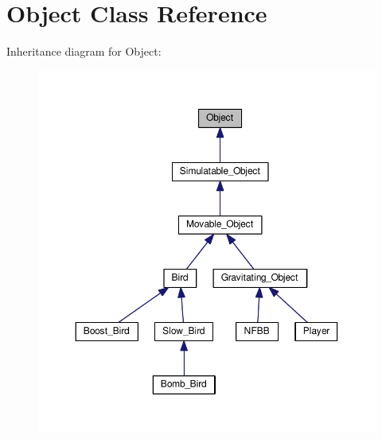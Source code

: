 \hypertarget{classObject}{\section{Object Class Reference}
\label{classObject}
}


Inheritance diagram for Object\+:\nopagebreak
\begin{figure}[H]
\begin{center}
\leavevmode
\includegraphics[width=350pt]{classObject__inherit__graph}
\end{center}
\end{figure}
